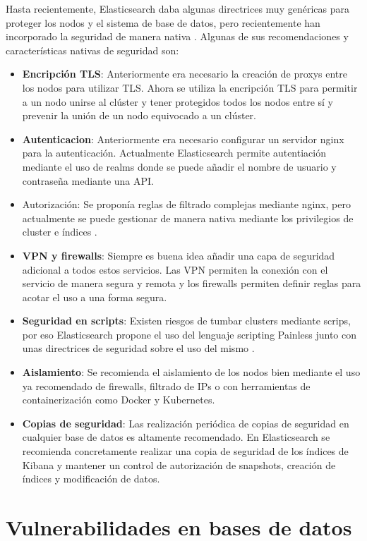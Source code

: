 \documentclass[a4paper,oneside]{article}
\begin{document}
Hasta recientemente, Elasticsearch daba algunas directrices muy genéricas para proteger los nodos y el sistema de base de datos, pero recientemente han incorporado la seguridad de manera nativa \cite{elastic}. Algunas de sus recomendaciones y características nativas de seguridad son:
\begin{itemize}
\item \textbf{Encripción TLS}: Anteriormente era necesario la creación de proxys entre los nodos para utilizar TLS. Ahora se utiliza la encripción TLS para permitir a un nodo unirse al clúster y tener protegidos todos los nodos entre sí y prevenir la unión de un nodo equivocado a un clúster.
\item \textbf{Autenticacion}: Anteriormente era necesario configurar un servidor nginx para la autenticación. Actualmente Elasticsearch permite autentiación mediante el uso de realms donde se puede añadir el nombre de usuario y contraseña mediante una API.
\item Autorización: Se proponía reglas de filtrado complejas mediante nginx, pero actualmente se puede gestionar de manera nativa mediante los privilegios de cluster e índices \cite{privileges}.
\item \textbf{VPN y firewalls}: Siempre es buena idea añadir una capa de seguridad adicional a todos estos servicios. Las VPN permiten la conexión con el servicio de manera segura y remota y los firewalls permiten definir reglas para acotar el uso a una forma segura.
\item \textbf{Seguridad en scripts}: Existen riesgos de tumbar clusters mediante scrips, por eso Elasticsearch propone el uso del lenguaje scripting Painless junto con unas directrices de seguridad sobre el uso del mismo \cite{painless} \cite{scripting}.\item \textbf{Aislamiento}: Se recomienda el aislamiento de los nodos bien mediante el uso ya recomendado de firewalls, filtrado de IPs o con herramientas de containerización como Docker y Kubernetes.
\item \textbf{Copias de seguridad}: Las realización periódica de copias de seguridad en cualquier base de datos es altamente recomendado. En Elasticsearch se recomienda concretamente realizar una copia de seguridad de los índices de Kibana y mantener un control de autorización de snapshots, creación de índices y modificación de datos.
\end{itemize}

\section{Vulnerabilidades en bases de datos}
\end{document}
